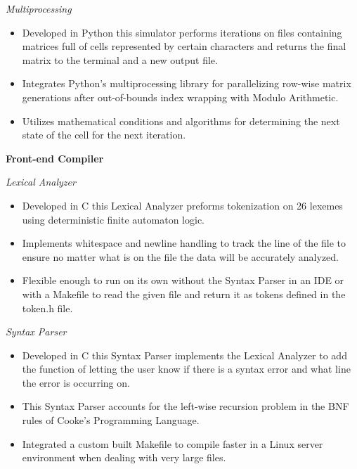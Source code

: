 \documentclass[a4paper,11pt]{article}
\begin{document}
 \textit{Multiprocessing}
  \vspace{-0.8em}
 \begin{itemize}
     \item Developed in Python this simulator performs iterations on files containing matrices full of cells represented by certain characters and returns the final matrix to the terminal and a new output file. \vspace{-0.8em}
     \item Integrates Python's multiprocessing library for parallelizing row-wise matrix generations after out-of-bounds index wrapping with Modulo Arithmetic. \vspace{-0.8em}
     \item Utilizes mathematical conditions and algorithms for determining the next state of the cell for the next iteration. \vspace{-0.8em}
 \end{itemize}

\textbf{Front-end Compiler}

\textit{Lexical Analyzer}
\vspace{-0.8em}
\begin{itemize}
    \item Developed in C this Lexical Analyzer preforms tokenization on 26 lexemes using deterministic finite automaton logic.\vspace{-0.8em}
    \item Implements whitespace and newline handling to track the line of the file to ensure no matter what is on the file the data will be accurately analyzed. \vspace{-0.8em}
    \item Flexible enough to run on its own without the Syntax Parser in an IDE or with a Makefile to read the given file and return it as tokens defined in the token.h file.
\end{itemize}
\vspace{-0.8em}
\textit{Syntax Parser}
\vspace{-0.8em}
\begin{itemize}
    \item Developed in C this Syntax Parser implements the Lexical Analyzer to add the function of letting the user know if there is a syntax error and what line the error is occurring on.
    \vspace{-0.8em}
    \item This Syntax Parser accounts for the left-wise recursion problem in the BNF rules of Cooke's Programming Language.\vspace{-0.8em}
    \item Integrated a custom built Makefile to compile faster in a Linux server environment when dealing with very large files.
\end{itemize}
\end{document}
